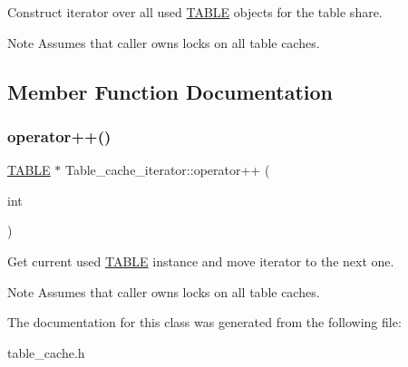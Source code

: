 Construct iterator over all used \mbox{\hyperlink{structTABLE}{T\+A\+B\+LE}} objects for the table share.

\begin{DoxyNote}{Note}
Assumes that caller owns locks on all table caches. 
\end{DoxyNote}


\subsection{Member Function Documentation}
\mbox{\label{classTable__cache__iterator_af5dc1e3ac1faa2b8639e221f774d4a19}} 
\subsubsection{\texorpdfstring{operator++()}{operator++()}}
{\footnotesize\ttfamily \mbox{\hyperlink{structTABLE}{T\+A\+B\+LE}} $\ast$ Table\+\_\+cache\+\_\+iterator\+::operator++ (\begin{DoxyParamCaption}\item[{int}]{ }\end{DoxyParamCaption})\hspace{0.3cm}{\ttfamily [inline]}}

Get current used \mbox{\hyperlink{structTABLE}{T\+A\+B\+LE}} instance and move iterator to the next one.

\begin{DoxyNote}{Note}
Assumes that caller owns locks on all table caches. 
\end{DoxyNote}


The documentation for this class was generated from the following file\+:\begin{DoxyCompactItemize}
\item 
table\+\_\+cache.\+h\end{DoxyCompactItemize}
